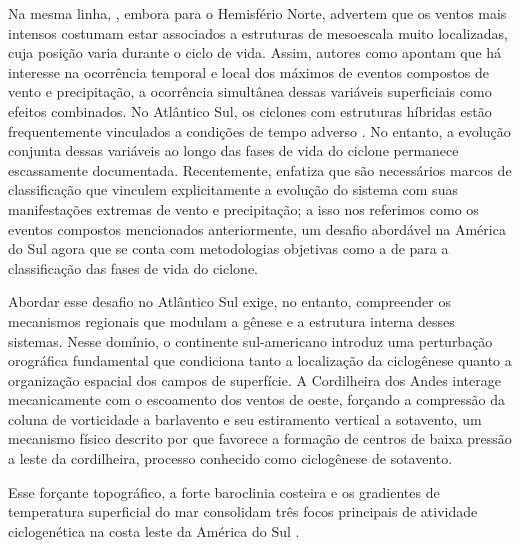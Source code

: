 Na mesma linha, \citet{eisenstein2023identification}, embora para o Hemisfério Norte, advertem que os ventos mais intensos costumam estar associados a estruturas de mesoescala muito localizadas, cuja posição varia durante o ciclo de vida. Assim, autores como \citet{zscheischler2018future} apontam que há interesse na ocorrência temporal e local dos máximos de eventos compostos de vento e precipitação, a ocorrência simultânea dessas variáveis superficiais como efeitos combinados.
No Atlântico Sul, os ciclones com estruturas híbridas estão frequentemente vinculados a condições de tempo adverso \citep{marrafon2022classificacao}. No entanto, a evolução conjunta dessas variáveis ao longo das fases de vida do ciclone permanece escassamente documentada. Recentemente, \citet{han2025system} enfatiza que são necessários marcos de classificação que vinculem explicitamente a evolução do sistema com suas manifestações extremas de vento e precipitação; a isso nos referimos como os eventos compostos mencionados anteriormente, um desafio abordável na América do Sul agora que se conta com metodologias objetivas como a de \citet{coutodesouza2024new} para a classificação das fases de vida do ciclone.


Abordar esse desafio no Atlântico Sul exige, no entanto, compreender os mecanismos regionais que modulam a gênese e a estrutura interna desses sistemas. Nesse domínio, o continente sul-americano introduz uma perturbação orográfica fundamental que condiciona tanto a localização da ciclogênese quanto a organização espacial dos campos de superfície. A Cordilheira dos Andes interage mecanicamente com o escoamento dos ventos de oeste, forçando a compressão da coluna de vorticidade a barlavento e seu estiramento vertical a sotavento, um mecanismo físico descrito por \citet{gan1994influence} que favorece a formação de centros de baixa pressão a leste da cordilheira, processo conhecido como ciclogênese de sotavento.

Esse forçante topográfico, a forte baroclinia costeira e os gradientes de temperatura superficial do mar consolidam três focos principais de atividade ciclogenética na costa leste da América do Sul \citep{reboita2026meteorology}.

